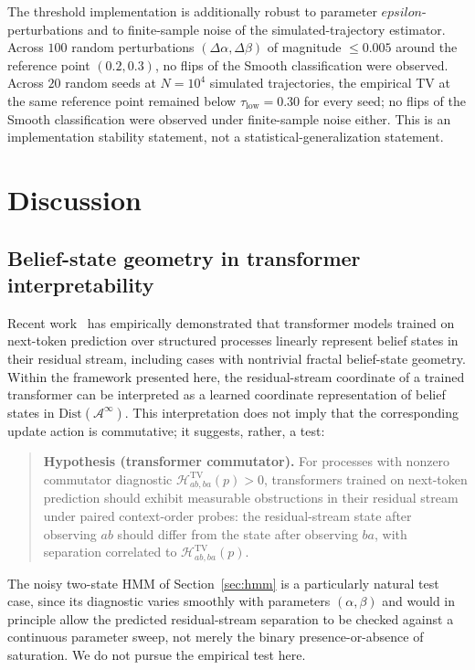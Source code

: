 \documentclass[11pt,a4paper]{article}
\def\varepsilon{epsilon}%
\theoremstyle{plain}
\theoremstyle{definition}
\theoremstyle{remark}
\newcommand{\Dist}{\mathrm{Dist}}
\newcommand{\Alphabet}{\mathcal{A}}
\begin{document}
The threshold implementation is additionally robust to parameter $\varepsilon$-perturbations and to finite-sample noise of the simulated-trajectory estimator. Across $100$ random perturbations $(\Delta\alpha, \Delta\beta)$ of magnitude $\leq 0.005$ around the reference point $(0.2, 0.3)$, no flips of the Smooth classification were observed. Across $20$ random seeds at $N = 10^4$ simulated trajectories, the empirical TV at the same reference point remained below $\tau_{\mathrm{low}} = 0.30$ for every seed; no flips of the Smooth classification were observed under finite-sample noise either. This is an implementation stability statement, not a statistical-generalization statement.

\section{Discussion}
\label{sec:discussion}

\subsection{Belief-state geometry in transformer interpretability}
\label{subsec:transformers}

Recent work~\cite{shai2024} has empirically demonstrated that transformer models trained on next-token prediction over structured processes linearly represent belief states in their residual stream, including cases with nontrivial fractal belief-state geometry. Within the framework presented here, the residual-stream coordinate of a trained transformer can be interpreted as a learned coordinate representation of belief states in $\Dist(\Alphabet^\infty)$. This interpretation does not imply that the corresponding update action is commutative; it suggests, rather, a test:

\begin{quote}
\textbf{Hypothesis (transformer commutator).} For processes with nonzero commutator diagnostic $\mathcal{H}^{\mathrm{TV}}_{ab,ba}(p) > 0$, transformers trained on next-token prediction should exhibit measurable obstructions in their residual stream under paired context-order probes: the residual-stream state after observing $ab$ should differ from the state after observing $ba$, with separation correlated to $\mathcal{H}^{\mathrm{TV}}_{ab,ba}(p)$.
\end{quote}

The noisy two-state HMM of Section~\ref{sec:hmm} is a particularly natural test case, since its diagnostic varies smoothly with parameters $(\alpha, \beta)$ and would in principle allow the predicted residual-stream separation to be checked against a continuous parameter sweep, not merely the binary presence-or-absence of saturation. We do not pursue the empirical test here.
\end{document}
